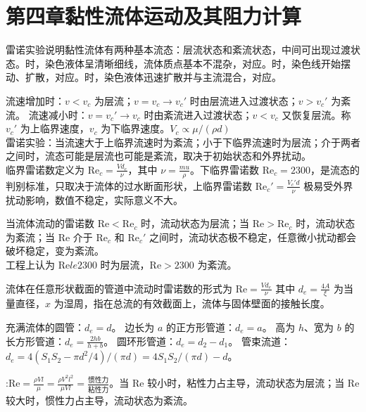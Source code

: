 \section{第四章\quad 黏性流体运动及其阻力计算}


雷诺实验说明黏性流体有两种基本流态：层流状态和紊流状态，中间可出现过渡状态。时，染色液体呈清晰细线，流体质点基本不混杂，对应。时，染色线开始摆动、扩散，对应。时，染色液体迅速扩散并与主流混合，对应。

流速增加时：$v<v_c$ 为层流；$v=v_c \to v_c'$ 时由层流进入过渡状态；$v>v_c'$ 为紊流。
流速减小时：$v=v_c' \to v_c$ 时由紊流进入过渡状态；$v<v_c$ 又恢复层流。称 $v_c'$ 为上临界速度，$v_c$ 为下临界速度。$V_c \propto \mu/(\rho d)$ \\

雷诺实验：当流速大于上临界流速时为紊流；小于下临界流速时为层流；介于两者之间时，流态可能是层流也可能是紊流，取决于初始状态和外界扰动。 \\
临界雷诺数定义为 $\mathrm{Re}_c=\frac{Vd_e}{\nu}$，其中 $\nu=\frac{mu}{\rho}$。下临界雷诺数 $\mathrm{Re}_c=2300$，是流态的判别标准，只取决于流体的过水断面形状，上临界雷诺数 $\mathrm{Re}_c'=\frac{V_c'd}{\nu}$ 极易受外界扰动影响，数值不稳定，实际意义不大。

当流体流动的雷诺数 $\mathrm{Re}<\mathrm{Re}_c$ 时，流动状态为层流；当 $\mathrm{Re}>\mathrm{Re}_c$ 时，流动状态为紊流；当 $\mathrm{Re}$ 介于 $\mathrm{Re}_c$ 和 $\mathrm{Re}_c'$ 之间时，流动状态极不稳定，任意微小扰动都会破坏稳定，变为紊流。\\

工程上认为 $\mathrm{Re}le 2300$ 时为层流，$\mathrm{Re}>2300$ 为紊流。

流体在任意形状截面的管道中流动时雷诺数的形式为 $\mathrm{Re}=\frac{Vd_e}{\nu}$ 其中 $d_e=\frac{4A}{\xi}$ 为当量直径，$x$ 为湿周，指在总流的有效截面上，流体与固体壁面的接触长度。

充满流体的圆管：$d_e=d$。
边长为 $a$ 的正方形管道：$d_e=a$。
高为 $h$、宽为 $b$ 的长方形管道：$d_e=\frac{2hb}{h+b}$。
圆环形管道：$d_e=d_2-d_1$。
管束流道：$d_e=4(S_1S_2-\pi d^2/4)/(\pi d)=4S_1S_2/(\pi d)-d$。

:$\mathrm{Re}=\frac{\rho Vl}{\mu}=\frac{\rho V^2 l^2}{\mu Vl}=\frac{\text{惯性力}}{\text{粘性力}}$。当 $\mathrm{Re}$ 较小时，粘性力占主导，流动状态为层流；当 $\mathrm{Re}$ 较大时，惯性力占主导，流动状态为紊流。

